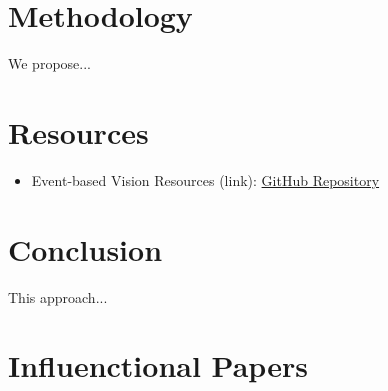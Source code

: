 \documentclass{article}
\begin{document}
\begin{itemize}
    \end{itemize}

\section{Methodology}
We propose...

\section{Resources}
\begin{itemize}
    \item Event-based Vision Resources (link): \href{https://github.com/uzh-rpg/event-based_vision_resources?tab=readme-ov-file#event-based-vision-resources}{GitHub Repository}
\end{itemize}

\section{Conclusion}
This approach...


\section{Influenctional Papers}
\end{document}
